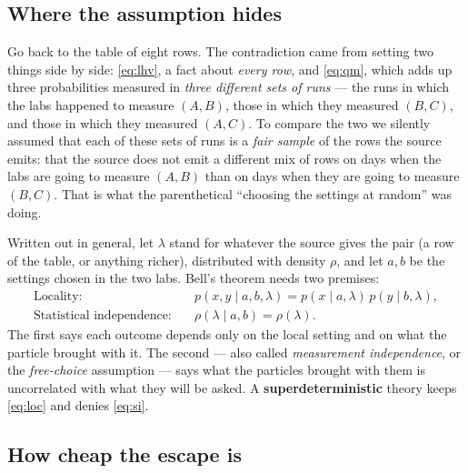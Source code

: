 \documentclass[11pt,a4paper]{article}
\theoremstyle{remark}
\begin{document}
\subsection{Where the assumption hides}

Go back to the table of eight rows. The contradiction came from setting two
things side by side: \eqref{eq:lhv}, a fact about \emph{every row}, and
\eqref{eq:qm}, which adds up three probabilities measured in \emph{three
different sets of runs} --- the runs in which the labs happened to measure
$(A,B)$, those in which they measured $(B,C)$, and those in which they measured
$(A,C)$. To compare the two we silently assumed that each of these sets of runs
is a \emph{fair sample} of the rows the source emits: that the source does not
emit a different mix of rows on days when the labs are going to measure $(A,B)$
than on days when they are going to measure $(B,C)$. That is what the
parenthetical ``choosing the settings at random'' was doing.

Written out in general, let $\lambda$ stand for whatever the source gives the
pair (a row of the table, or anything richer), distributed with density
$\rho$, and let $a,b$ be the settings chosen in the two labs. Bell's theorem
needs two premises:
\begin{align}
 \text{Locality:}\quad & p(x,y\mid a,b,\lambda) = p(x\mid a,\lambda)\,p(y\mid b,\lambda),
 \label{eq:loc}\\
 \text{Statistical independence:}\quad & \rho(\lambda\mid a,b) = \rho(\lambda).
 \label{eq:si}
\end{align}
The first says each outcome depends only on the local setting and on what the
particle brought with it. The second --- also called \emph{measurement
independence}, or the \emph{free-choice} assumption --- says what the particles
brought with them is uncorrelated with what they will be asked. A
\textbf{superdeterministic} theory keeps \eqref{eq:loc} and denies
\eqref{eq:si}.

\subsection{How cheap the escape is}
\end{document}
